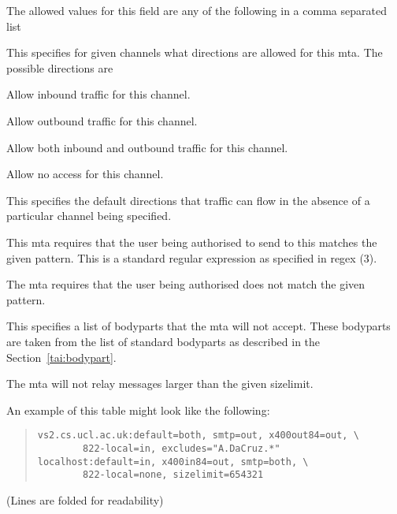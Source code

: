 The allowed values for this field are any of the following in a comma
separated list
\begin{describe}
\item[\verb|<channel>=<direction>|:]
This specifies for given channels what directions are allowed for this
mta. The possible directions are
	\begin{describe}
	\item[\verb|in|:] Allow inbound traffic for this channel.
	\item[\verb|out|:]	Allow outbound traffic for this channel.
	\item[\verb|both|:]	Allow both inbound and outbound
		traffic for this channel.

	\item[\verb|none|:]	Allow no access for this channel.
	\end{describe}

\item[\verb|default=<direction>|:]
This specifies the default directions that traffic can flow in the
absence of a particular channel being specified.

\item[\verb|requires=<pattern>|:]
This mta requires that the user being authorised to send to this
matches the given pattern. This is a standard regular expression as
specified in \man regex (3).

\item[\verb|excludes=<pattern>|:]
The mta requires that the user being authorised does not match the
given pattern.

\item[\verb|bodypart-excludes=<bodyparts>|:]
This specifies a list of bodyparts that the mta will not accept.
These bodyparts are taken from the list of standard bodyparts as
described in the Section~\ref{tai:bodypart}.

\item[\verb|sizelimit=<digits>|:]
The mta will not relay messages larger than the given sizelimit.
\end{describe}

An example of this table might look like the following:
\begin{quote}\small\begin{verbatim}
vs2.cs.ucl.ac.uk:default=both, smtp=out, x400out84=out, \
        822-local=in, excludes="A.DaCruz.*"
localhost:default=in, x400in84=out, smtp=both, \
        822-local=none, sizelimit=654321
\end{verbatim}\end{quote}
(Lines are folded for readability)

